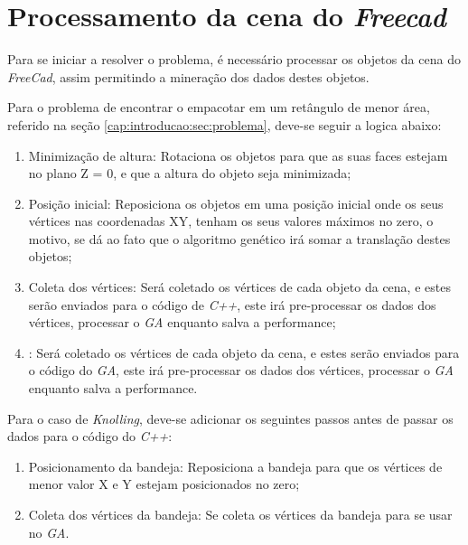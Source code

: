 \section{Processamento da cena do \textit{Freecad}}
Para se iniciar a resolver o problema, é necessário processar os objetos da cena do \textit{FreeCad}, assim permitindo a mineração dos dados destes objetos.

Para o problema de encontrar o empacotar em um retângulo de menor área, referido na seção \ref{cap:introducao:sec:problema}, deve-se seguir a logica abaixo:
\begin{enumerate}
    \item Minimização de altura: Rotaciona os objetos para que as suas faces estejam no plano Z = 0, e que a altura do objeto seja minimizada;
    \item Posição inicial: Reposiciona os objetos em uma posição inicial onde os seus vértices nas coordenadas XY, tenham os seus valores máximos no zero, o motivo, se dá ao fato que o algoritmo genético irá somar a translação destes objetos;
    \item Coleta dos vértices: Será coletado os vértices de cada objeto da cena, e estes serão enviados para o código de \textit{C++}, este irá pre-processar os dados dos vértices, processar o \textit{GA} enquanto salva a performance;
    \item : Será coletado os vértices de cada objeto da cena, e estes serão enviados para o código do \textit{GA}, este irá pre-processar os dados dos vértices, processar o \textit{GA} enquanto salva a performance.
\end{enumerate}

Para o caso de \textit{Knolling}, deve-se adicionar os seguintes passos antes de passar os dados para o código do \textit{C++}:
\begin{enumerate}
    \item Posicionamento da bandeja: Reposiciona a bandeja para que os vértices de menor valor X e Y estejam posicionados no zero;
    \item Coleta dos vértices da bandeja: Se coleta os vértices da bandeja para se usar no \textit{GA}.
\end{enumerate}

